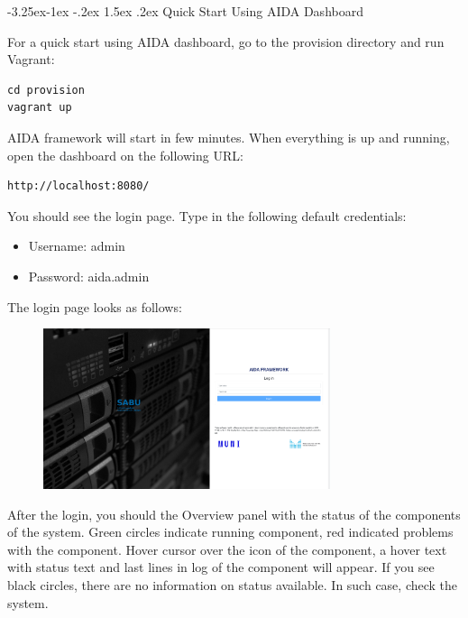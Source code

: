 \documentclass[a4paper]{article} %
\makeatletter
\renewcommand\subsection{\@startsection{subsection}{2}{\z@}%
                   {-3.25ex\@plus -1ex \@minus -.2ex}%
                   {1.5ex \@plus .2ex}%
                   {\normalfont\sffamily\large\bfseries\color{projectcolor}}}
\makeatother
\begin{document}
\cleardoublepage

\subsection{Quick Start Using AIDA Dashboard}

For a quick start using AIDA dashboard, go to the provision directory and run Vagrant:

\begin{lstlisting}[]
cd provision
vagrant up
\end{lstlisting}

AIDA framework will start in few minutes. When everything is up and running, open the dashboard on the following URL:

\begin{lstlisting}[]
http://localhost:8080/
\end{lstlisting}

You should see the login page. Type in the following default credentials:
\begin{itemize}[noitemsep,nolistsep]
  \item[] Username: admin
  \item[] Password: aida.admin
\end{itemize}
The login page looks as follows:

\begin{figure}[h]
  \centering
  \includegraphics[width=0.75\textwidth]{fig/dashboard_login}
\end{figure}

After the login, you should the Overview panel with the status of the components of the system. Green circles indicate running component, red indicated problems with the component. Hover cursor over the icon of the component, a hover text with status text and last lines in log of the component will appear. If you see black circles, there are no information on status available. In such case, check the system.
\end{document}
